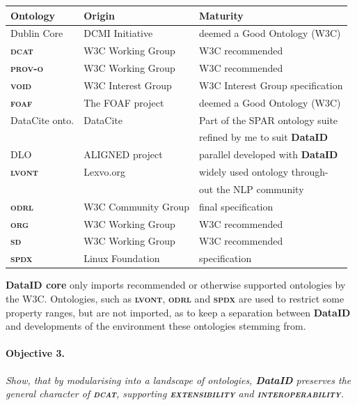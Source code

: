 \documentclass[a4paper,english,twoside,BCOR1.5cm,headsepline,DIV12,appendixprefix,final,12pt]{scrbook}
\newcommand{\extensibility}{{\ttfamily\scshape\bfseries extensibility}\xspace}
\newcommand{\interoperability}{{\ttfamily\scshape\bfseries interoperability}\xspace}
\newcommand{\dataid}{{\ttfamily\bfseries DataID}\xspace}
\newcommand{\core}{{\ttfamily\bfseries DataID core}\xspace}
\newcommand{\odrl}{{\scshape\bfseries odrl}\xspace}
\newcommand{\org}{{\scshape\bfseries org}\xspace}
\newcommand{\prov}{{\scshape\bfseries prov-o}\xspace}
\newcommand{\void}{{\scshape\bfseries void}\xspace}
\newcommand{\dcat}{{\scshape\bfseries dcat}\xspace}
\newcommand{\foaf}{{\scshape\bfseries foaf}\xspace}
\newcommand{\spdx}{{\scshape\bfseries spdx}\xspace}
\newcommand{\sd}{{\scshape\bfseries sd}\xspace}
\newcommand{\lvont}{{\scshape\bfseries lvont}\xspace}
\newcommand\footnoteurl[1]{\footnote{\scriptsize\url{#1}}}
\begin{document}
\begin{table}[!htbp]
    \centering
    \begin{tabular}{|l|l|l|}
        \hline
        Ontology & Origin & Maturity \\
        \hline
        Dublin Core & DCMI Initiative & deemed a Good Ontology (W3C)\\
        \dcat & W3C Working Group & W3C recommended\\
        \prov & W3C Working Group & W3C recommended\\
        \void & W3C Interest Group & W3C Interest Group specification\\
        \foaf & The FOAF project & deemed a Good Ontology (W3C)\\
        DataCite onto. & DataCite & Part of the SPAR ontology suite\\%
        & & refined by me to suit \dataid\\
        DLO & ALIGNED project & parallel developed with \dataid\\
        \lvont & Lexvo.org & widely used ontology through-\\
        & & out the NLP community\\
        \odrl & W3C Community Group & final specification\\
        \org & W3C Working Group & W3C recommended\\
        \sd & W3C Working Group & W3C recommended\\
        \spdx & Linux Foundation & specification\\
        \hline
    \end{tabular}
    \label{tab:evalontos}
\end{table}

\core only imports recommended or otherwise supported ontologies by the W3C.
Ontologies, such as \lvont, \odrl and \spdx are used to restrict some property ranges, but are not imported, as to keep a separation between \dataid and developments of the environment these ontologies stemming from.

\paragraph{Objective 3.} \textit{Show, that by modularising into a landscape of ontologies, \dataid preserves the general character of \dcat, supporting \extensibility and \interoperability.}
\end{document}
